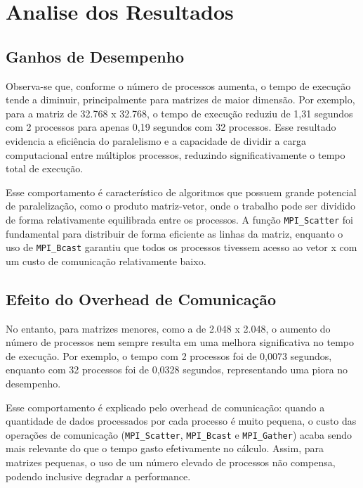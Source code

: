 \documentclass[a4paper, 12pt]{article}
\begin{document}
	\section{Analise dos Resultados}
	
	\subsection{Ganhos de Desempenho}
	\hspace{0.62cm}Observa-se que, conforme o número de processos aumenta, o tempo de execução tende a diminuir, principalmente para matrizes de maior dimensão. Por exemplo, para a matriz de 32.768 x 32.768, o tempo de execução reduziu de 1,31 segundos com 2 processos para apenas 0,19 segundos com 32 processos. Esse resultado evidencia a eficiência do paralelismo e a capacidade de dividir a carga computacional entre múltiplos processos, reduzindo significativamente o tempo total de execução.
	
	Esse comportamento é característico de algoritmos que possuem grande potencial de paralelização, como o produto matriz-vetor, onde o trabalho pode ser dividido de forma relativamente equilibrada entre os processos. A função \texttt{MPI\_Scatter} foi fundamental para distribuir de forma eficiente as linhas da matriz, enquanto o uso de \texttt{MPI\_Bcast} garantiu que todos os processos tivessem acesso ao vetor x com um custo de comunicação relativamente baixo.
	
	\subsection{Efeito do Overhead de Comunicação}
	\hspace{0.62cm}No entanto, para matrizes menores, como a de 2.048 x 2.048, o aumento do número de processos nem sempre resulta em uma melhora significativa no tempo de execução. Por exemplo, o tempo com 2 processos foi de 0,0073 segundos, enquanto com 32 processos foi de 0,0328 segundos, representando uma piora no desempenho.
	
	Esse comportamento é explicado pelo overhead de comunicação: quando a quantidade de dados processados por cada processo é muito pequena, o custo das operações de comunicação (\texttt{MPI\_Scatter}, \texttt{MPI\_Bcast} e \texttt{MPI\_Gather}) acaba sendo mais relevante do que o tempo gasto efetivamente no cálculo. Assim, para matrizes pequenas, o uso de um número elevado de processos não compensa, podendo inclusive degradar a performance.
	
\end{document}
